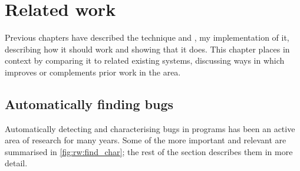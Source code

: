 \chapter{Related work}
\label{chapter:related_work}

    

Previous chapters have described the {\technique} technique and
{\implementation}, my implementation of it, describing how it should
work and showing that it does.  This chapter places {\technique} in
context by comparing it to related existing systems, discussing ways
in which {\technique} improves or complements prior work in the area.

\section{Automatically finding bugs}

Automatically detecting and characterising bugs in programs has been
an active area of research for many years.  Some of the more important
and relevant are summarised in \autoref{fig:rw:find_char}; the rest of
the section describes them in more detail.

